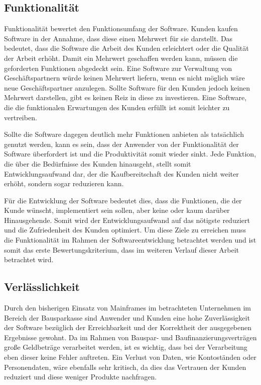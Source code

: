         \subsection{Funktionalität}

            Funktionalität bewertet den Funktionsumfang der Software. Kunden kaufen Software in der Annahme, dass diese einen Mehrwert für sie darstellt. Das bedeutet, dass die Software die Arbeit des Kunden erleichtert oder die Qualität der Arbeit erhöht. Damit ein Mehrwert geschaffen werden kann, müssen die geforderten Funktionen abgedeckt sein. Eine Software zur Verwaltung von Geschäftspartnern würde keinen Mehrwert liefern, wenn es nicht möglich wäre neue Geschäftspartner anzulegen. Sollte Software für den Kunden jedoch keinen Mehrwert darstellen, gibt es keinen Reiz in diese zu investieren. Eine Software, die die funktionalen Erwartungen des Kunden erfüllt ist somit leichter zu vertreiben.

            Sollte die Software dagegen deutlich mehr Funktionen anbieten als tatsächlich genutzt werden, kann es sein, dass der Anwender von der Funktionalität der Software überfordert ist und die Produktivität somit wieder sinkt. Jede Funktion, die über die Bedürfnisse des Kunden hinausgeht, stellt somit Entwicklungsaufwand dar, der die Kaufbereitschaft des Kunden nicht weiter erhöht, sondern sogar reduzieren kann.

            Für die Entwicklung der Software bedeutet dies, dass die Funktionen, die der Kunde wünscht, implementiert sein sollen, aber keine oder kaum darüber Hinausgehende. Somit wird der Entwicklungsaufwand auf das nötigste reduziert und die Zufriedenheit des Kunden optimiert.
            Um diese Ziele zu erreichen muss die Funktionalität im Rahmen der Softwareentwicklung betrachtet werden und ist somit das erste Bewertungskriterium, dass im weiteren Verlauf dieser Arbeit betrachtet wird.

        \subsection{Verlässlichkeit}

            Durch den bisherigen Einsatz von Mainframes im betrachteten Unternehmen im Bereich der Bausparkasse sind Anwender und Kunden eine hohe Zuverlässigkeit der Software bezüglich der Erreichbarkeit und der Korrektheit der ausgegebenen Ergebnisse gewohnt. Da im Rahmen von Bauspar- und Baufinanzierungsverträgen große Geldbeträge verarbeitet werden, ist es wichtig, dass bei der Verarbeitung eben dieser keine Fehler auftreten. Ein Verlust von Daten, wie Kontoständen oder Personendaten, wäre ebenfalls sehr kritisch, da dies das Vertrauen der Kunden reduziert und diese weniger Produkte nachfragen.

